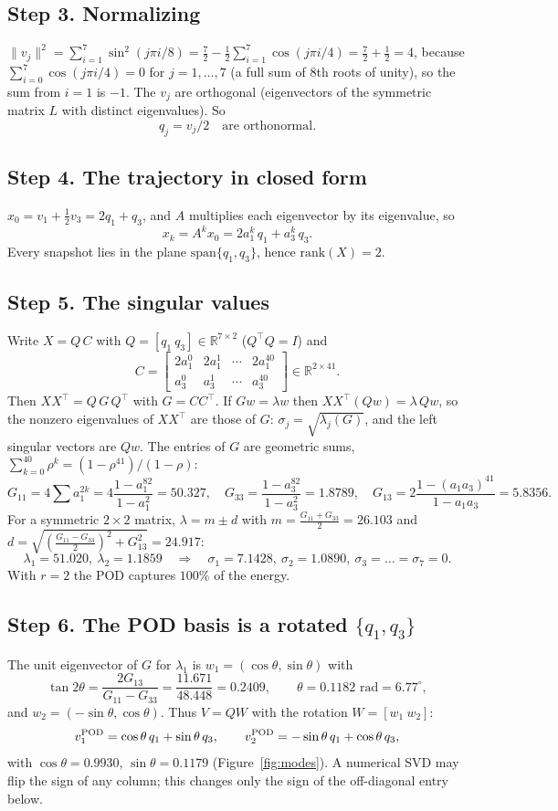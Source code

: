 \documentclass[11pt]{article}
\theoremstyle{remark}\newtheorem{remark}{Remark}
\newcommand{\R}{\mathbb{R}}
\begin{document}
\subsection*{Step 3. Normalizing}
$\|v_j\|^2=\sum_{i=1}^7\sin^2(j\pi i/8)=\tfrac72-\tfrac12\sum_{i=1}^7\cos(j\pi i/4)=\tfrac72+\tfrac12=4$, because $\sum_{i=0}^{7}\cos(j\pi i/4)=0$ for $j=1,\dots,7$ (a full sum of 8th roots of unity), so the sum from $i=1$ is $-1$. The $v_j$ are orthogonal (eigenvectors of the symmetric matrix $L$ with distinct eigenvalues). So
\[
q_j=v_j/2\quad\text{are orthonormal.}
\]

\subsection*{Step 4. The trajectory in closed form}
$x_0=v_1+\tfrac12v_3=2q_1+q_3$, and $A$ multiplies each eigenvector by its eigenvalue, so
\[
\boxed{x_k=A^kx_0=2a_1^k\,q_1+a_3^k\,q_3 .}
\]
Every snapshot lies in the plane $\mathrm{span}\{q_1,q_3\}$, hence $\mathrm{rank}(X)=2$.

\subsection*{Step 5. The singular values}
Write $X=Q\,C$ with $Q=[q_1\ q_3]\in\R^{7\times2}$ ($Q^\top Q=I$) and
\[
C=\begin{bmatrix}2a_1^0&2a_1^1&\cdots&2a_1^{40}\\ a_3^0&a_3^1&\cdots&a_3^{40}\end{bmatrix}\in\R^{2\times41}.
\]
Then $XX^\top=Q\,G\,Q^\top$ with $G=CC^\top$. If $Gw=\lambda w$ then $XX^\top(Qw)=\lambda\,Qw$, so the nonzero eigenvalues of $XX^\top$ are those of $G$: $\sigma_j=\sqrt{\lambda_j(G)}$, and the left singular vectors are $Qw$. The entries of $G$ are geometric sums, $\sum_{k=0}^{40}\rho^k=(1-\rho^{41})/(1-\rho)$:
\[
G_{11}=4\sum a_1^{2k}=4\frac{1-a_1^{82}}{1-a_1^2}=50.327,\quad
G_{33}=\frac{1-a_3^{82}}{1-a_3^2}=1.8789,\quad
G_{13}=2\frac{1-(a_1a_3)^{41}}{1-a_1a_3}=5.8356 .
\]
For a symmetric $2\times2$ matrix, $\lambda=m\pm d$ with $m=\tfrac{G_{11}+G_{33}}2=26.103$ and $d=\sqrt{(\tfrac{G_{11}-G_{33}}2)^2+G_{13}^2}=24.917$:
\[
\lambda_1=51.020,\ \lambda_2=1.1859\quad\Longrightarrow\quad\boxed{\sigma_1=7.1428,\ \sigma_2=1.0890,\ \sigma_3=\dots=\sigma_7=0.}
\]
With $r=2$ the POD captures $100\%$ of the energy.

\subsection*{Step 6. The POD basis is a rotated $\{q_1,q_3\}$}
The unit eigenvector of $G$ for $\lambda_1$ is $w_1=(\cos\theta,\sin\theta)$ with
\[
\tan2\theta=\frac{2G_{13}}{G_{11}-G_{33}}=\frac{11.671}{48.448}=0.2409,\qquad \theta=0.1182\text{ rad}=6.77^\circ,
\]
and $w_2=(-\sin\theta,\cos\theta)$. Thus $V=QW$ with the rotation $W=[w_1\ w_2]$:
\[
v^{\rm POD}_1=\cos\theta\,q_1+\sin\theta\,q_3,\qquad v^{\rm POD}_2=-\sin\theta\,q_1+\cos\theta\,q_3 ,
\]
with $\cos\theta=0.9930$, $\sin\theta=0.1179$ (Figure~\ref{fig:modes}). A numerical SVD may flip the sign of any column; this changes only the sign of the off-diagonal entry below.
\end{document}
